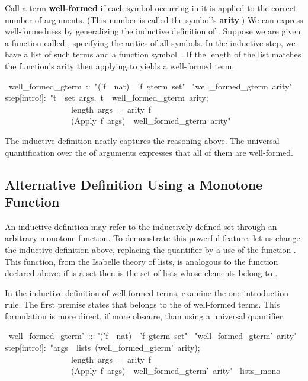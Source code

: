 Call a term \textbf{well-formed} if each symbol occurring in it is applied
to the correct number of arguments.  (This number is called the symbol's
\textbf{arity}.)  We can express well-formedness by
generalizing the inductive definition of
.
Suppose we are given a function called , specifying the arities
of all symbols.  In the inductive step, we have a list  of such
terms and a function  symbol~. If the length of the list matches the
function's arity  then applying  to  yields a well-formed
term. 
\begin{isabelle}
\ well_formed_gterm\ ::\ "('f\ \isasymRightarrow \ nat)\ \isasymRightarrow \ 'f\ gterm\ set"\isanewline
{}\ "well_formed_gterm\ arity"\isanewline
{}\isanewline
step[intro!]:\ "\isasymlbrakk \isasymforall t\ \isasymin \ set\ args.\ t\ \isasymin \ well_formed_gterm\ arity;\ \ \isanewline
\ \ \ \ \ \ \ \ \ \ \ \ \ \ \ \ length\ args\ =\ arity\ f\isasymrbrakk \isanewline
\ \ \ \ \ \ \ \ \ \ \ \ \ \ \ \isasymLongrightarrow \ (Apply\ f\ args)\ \isasymin \ well_formed_gterm\
arity"
\end{isabelle}
%
The inductive definition neatly captures the reasoning above.
The universal quantification over the
 of arguments expresses that all of them are well-formed.


\subsection{Alternative Definition Using a Monotone Function}

An inductive definition may refer to the inductively defined 
set through an arbitrary monotone function.  To demonstrate this
powerful feature, let us
change the  inductive definition above, replacing the
quantifier by a use of the function . This
function, from the Isabelle theory of lists, is analogous to the
function \isa{gterms} declared above: if  is a set then
{} is the set of lists whose elements belong to
\isa{A}.  

In the inductive definition of well-formed terms, examine the one
introduction rule.  The first premise states that \isa{args} belongs to
the \isa{lists} of well-formed terms.  This formulation is more
direct, if more obscure, than using a universal quantifier.
\begin{isabelle}
\ well_formed_gterm'\ ::\ "('f\ \isasymRightarrow \ nat)\ \isasymRightarrow \ 'f\ gterm\ set"\isanewline
\isacommand{inductive}\ "well_formed_gterm'\ arity"\isanewline
{}\isanewline
step[intro!]:\ "\isasymlbrakk args\ \isasymin \ lists\ (well_formed_gterm'\ arity);\ \ \isanewline
\ \ \ \ \ \ \ \ \ \ \ \ \ \ \ \ length\ args\ =\ arity\ f\isasymrbrakk \isanewline
\ \ \ \ \ \ \ \ \ \ \ \ \ \ \ \isasymLongrightarrow \ (Apply\ f\ args)\ \isasymin \ well_formed_gterm'\ arity"\isanewline
\isakeyword{monos}\ lists_mono
\end{isabelle}

